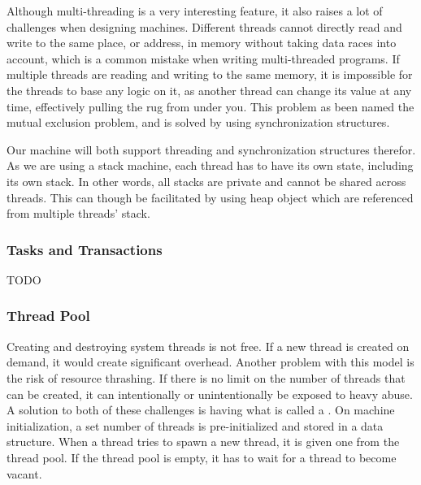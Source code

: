 Although multi-threading is a very interesting feature, it also raises a lot of
challenges when designing machines. Different threads cannot directly read and
write to the same place, or address, in memory without taking data races into
account, which is a common mistake when writing multi-threaded programs. If
multiple threads are reading and writing to the same memory, it is impossible
for the threads to base any logic on it, as another thread can change its value
at any time, effectively pulling the rug from under you. This problem as been
named the mutual exclusion problem, and is solved by using synchronization
structures.

Our machine will both support threading and synchronization structures
therefor. As we are using a stack machine, each thread has to have its own
state, including its own stack. In other words, all stacks are private and
cannot be shared across threads. This can though be facilitated by using heap
object which are referenced from multiple threads' stack.

\subsubsection{Tasks and Transactions}
TODO


\subsubsection{Thread Pool}
Creating and destroying system threads is not free. If a new thread is created
on demand, it would create significant overhead. Another problem with this model
is the risk of resource thrashing. If there is no limit on the number of threads
that can be created, it can intentionally or unintentionally be exposed to heavy
abuse. A solution to both of these challenges is having what is called a
. On machine initialization, a set number of threads is
pre-initialized and stored in a data structure. When a thread tries to spawn a
new thread, it is given one from the thread pool. If the thread pool is empty,
it has to wait for a thread to become vacant.

